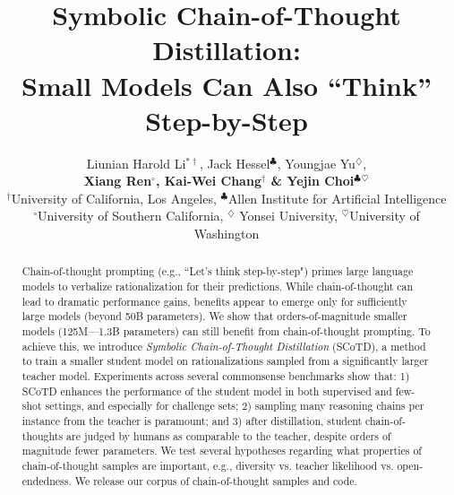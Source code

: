 \documentclass[11pt]{article}
\title{Symbolic Chain-of-Thought Distillation: \\ Small Models Can Also ``Think'' Step-by-Step}
\author{Liunian Harold Li$^{*\dagger}$, %
Jack Hessel$^{\clubsuit}$, Youngjae Yu$^{\diamondsuit}$, \\ \textbf{ Xiang Ren$^\circ$, Kai-Wei Chang$^\dagger$ \& Yejin Choi$^\clubsuit$$^\heartsuit$}\\
$^\dagger$University of California, Los Angeles,
$^\clubsuit$Allen Institute for Artificial Intelligence\\ 
$^\circ$University of Southern California, 
$^\diamondsuit$ Yonsei University,
$^\heartsuit$University of Washington \\
}
\begin{document}
\maketitle



\begin{abstract}

Chain-of-thought prompting (e.g., ``Let's think step-by-step") primes large language models to verbalize rationalization for their predictions. While chain-of-thought can lead to dramatic performance gains, benefits appear to emerge only for sufficiently large models (beyond 50B parameters). We show that orders-of-magnitude smaller models (125M---1.3B parameters) can still benefit from chain-of-thought prompting. To achieve this, we introduce \emph{Symbolic Chain-of-Thought Distillation} (SCoTD), a method to train a smaller student model on rationalizations sampled from a significantly larger teacher model. Experiments across several commonsense benchmarks show that: 1) SCoTD enhances the performance of the student model in both supervised and few-shot settings, and especially for challenge sets; 2) sampling many reasoning chains per instance from the teacher is paramount; and 3) after distillation, student chain-of-thoughts are judged by humans as comparable to the teacher, despite orders of magnitude fewer parameters. We test several hypotheses regarding what properties of chain-of-thought samples are important, e.g., diversity vs. teacher likelihood vs. open-endedness. We release our corpus of chain-of-thought samples and code.
%
\begin{comment}

Large Language Models (LLMs) can benefit from ``prompting with explanations'' and ``self-rationalize''. Recent work shows that large language models can be prompted to provide explanations and xxx 


\end{comment}
\end{abstract}
\end{document}
